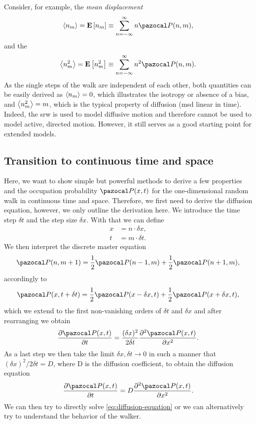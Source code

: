 Consider, for example, the \textit{mean displacement} 
\begin{equation*}
 \avg{n_m} = \E{n_m} \equiv \sum\limits_{n=-\infty}^\infty n \P(n,m),
\end{equation*}
and the 
\begin{equation*}
 \avg{n_m^2} = \E{n_m^2} \equiv \sum\limits_{n=-\infty}^\infty n^2 \P(n,m).
\end{equation*}
As the single steps of the walk are independent of each other, both quantities can be easily derived as $\left<n_m\right> = 0$, which illustrates the isotropy or absence of a bias, and $\left<n_m^2\right> = m$, which is the typical property of diffusion (\ac{msd} linear in time). Indeed, the \ac{srw} is used to model diffusive motion \cite{codling:2008} and therefore cannot be used to model active, directed motion. However, it still serves as a good starting point for extended models.

\subsection*{Transition to continuous time and space}
Here, we want to show simple but powerful methods to derive a few properties and the occupation probability $\P(x,t)$ for the one-dimensional random walk in continuous time and space. Therefore, we first need to derive the diffusion equation, however, we only outline the derivation here. We introduce the time step $\delta t$ and the step size $\delta x$. With that we can define
\begin{equation*}
 \begin{aligned}
  x &= n \cdot \delta x,
  \\
  t &= m \cdot \delta t.
 \end{aligned}
\end{equation*}
We then interpret the discrete master equation
\begin{equation*}
 \P(n, m+1) = \frac{1}{2} \P(n-1, m) + \frac{1}{2} \P(n+1, m),
\end{equation*}
accordingly to
\begin{equation*}
 \P(x, t+\delta t) = \frac{1}{2} \P(x-\delta x, t) + \frac{1}{2} \P(x+\delta x, t),
\end{equation*}
which we extend to the first non-vanishing orders of $\delta t$ and $\delta x$ and after rearranging we obtain
\begin{equation*}
 \frac{\partial \P(x, t)}{\partial t} = \dfrac{(\delta x)^2}{2 \delta t}\frac{\partial^2 \P(x, t)}{\partial x^2}.
\end{equation*}
As a last step we then take the limit $\delta x, \delta t \rightarrow 0$ in such a manner that $(\delta x)^2 / 2 \delta t = D$, where D is the diffusion coefficient, to obtain the diffusion equation
\begin{equation}\label{eq:diffusion-equation}
 \frac{\partial \P(x, t)}{\partial t} = D \frac{\partial^2 \P(x, t)}{\partial x^2}.
\end{equation}
We can then try to directly solve \autoref{eq:diffusion-equation} or we can alternatively try to understand the behavior of the walker.

